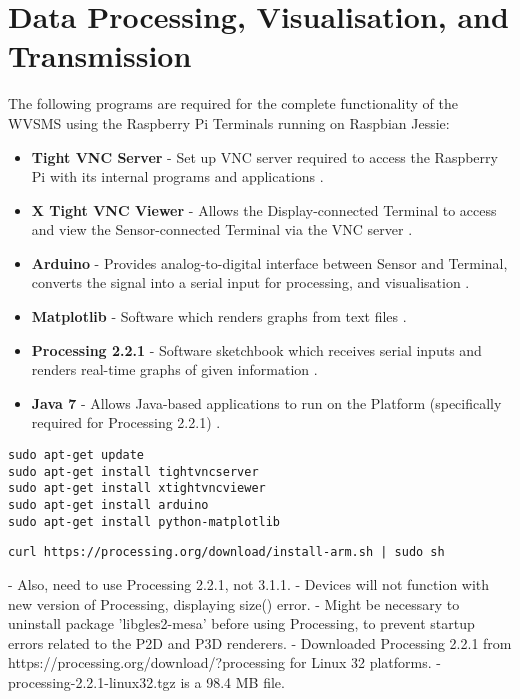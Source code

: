 \chapter{Data Processing, Visualisation, and Transmission} 
\label{processing}

The following programs are required for the complete functionality of the WVSMS using the Raspberry Pi Terminals running on Raspbian Jessie: 

\begin{itemize}
	\item \textbf{Tight VNC Server} - Set up VNC server required to access the Raspberry Pi with its internal programs and applications \cite{rpitightvncserver}.
	\item \textbf{X Tight VNC Viewer} - Allows the Display-connected Terminal to access and view the Sensor-connected Terminal via the VNC server	\cite{rpitightvncserver}.
	\item \textbf{Arduino} - Provides analog-to-digital interface between Sensor and Terminal, converts the signal into a serial input for processing, and visualisation \cite{arduino}.
	\item \textbf{Matplotlib} - Software which renders graphs from text files \cite{matplotlib}.
	\item \textbf{Processing 2.2.1} - Software sketchbook which receives serial inputs and renders real-time graphs of given information \cite{processing221}.
	\item \textbf{Java 7} - Allows Java-based applications to run on the Platform (specifically required for Processing 2.2.1) \cite{java7}.
\end{itemize}


\begin{lstlisting}
sudo apt-get update
sudo apt-get install tightvncserver
sudo apt-get install xtightvncviewer
sudo apt-get install arduino
sudo apt-get install python-matplotlib
\end{lstlisting}

\begin{lstlisting}
curl https://processing.org/download/install-arm.sh | sudo sh
\end{lstlisting}




- Also, need to use Processing 2.2.1, not 3.1.1. 
- Devices will not function with new version of Processing, displaying size() error. 
- Might be necessary to uninstall package 'libgles2-mesa' before using Processing, to prevent startup errors related to the P2D and P3D renderers. 
- Downloaded Processing 2.2.1 from https://processing.org/download/?processing for Linux 32 platforms. 
- processing-2.2.1-linux32.tgz is a 98.4 MB file. 


